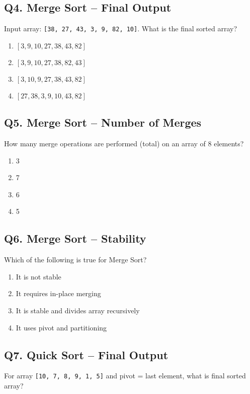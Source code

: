 
\subsection*{Q4. Merge Sort – Final Output}
Input array: \texttt{[38, 27, 43, 3, 9, 82, 10]}. What is the final sorted array?

\begin{enumerate}[label=(\alph*)]
    \item $[3, 9, 10, 27, 38, 43, 82]$ 
    \item $[3, 9, 10, 27, 38, 82, 43]$ 
    \item $[3, 10, 9, 27, 38, 43, 82]$ 
    \item $[27, 38, 3, 9, 10, 43, 82]$
\end{enumerate}


\subsection*{Q5. Merge Sort – Number of Merges}
How many merge operations are performed (total) on an array of 8 elements?

\begin{enumerate}[label=(\alph*)]
    \item 3 
    \item 7 
    \item 6 
    \item 5
\end{enumerate}


\subsection*{Q6. Merge Sort – Stability}
Which of the following is true for Merge Sort?

\begin{enumerate}[label=(\alph*)]
    \item It is not stable 
    \item It requires in-place merging 
    \item It is stable and divides array recursively 
    \item It uses pivot and partitioning
\end{enumerate}


\subsection*{Q7. Quick Sort – Final Output}
For array \texttt{[10, 7, 8, 9, 1, 5]} and pivot = last element, what is final sorted array?

